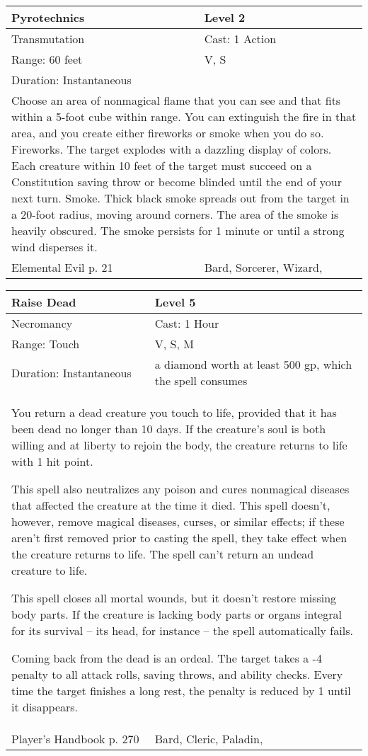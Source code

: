 \documentclass[11pt]{report}
\begin{document}
\begin{table}[H]
	\begin{tabular}{||p{6cm}|p{6cm}||}
		\hline\hline
		\bf{Pyrotechnics} & Level 2\\ \hline
		Transmutation & Cast: 1 Action\\ \hline
		Range: 60 feet & V, S\\ \hline
		Duration: Instantaneous & \\ \hline
		\multicolumn{2}{||p{12cm}||}{Choose an area of nonmagical flame that you can see and that fits within a 5-foot cube within range. You can extinguish the fire in that area, and you create either fireworks or smoke when you do so.
Fireworks. The target explodes with a dazzling display of colors. Each creature within 10 feet of the target must succeed on a Constitution saving throw or become blinded until the end of your next turn.
Smoke. Thick black smoke spreads out from the target in a 20-foot radius, moving around corners. The area of the smoke is heavily obscured. The smoke persists for 1 minute or until a strong wind disperses it.}\\ \hline
Elemental Evil p. 21 & Bard, Sorcerer, Wizard, \\ \hline\hline
	\end{tabular}
\end{table}

\begin{table}[H]
	\begin{tabular}{||p{6cm}|p{6cm}||}
		\hline\hline
		\bf{Raise Dead} & Level 5\\ \hline
		Necromancy & Cast: 1 Hour\\ \hline
		Range: Touch & V, S, M\\ \hline
		Duration: Instantaneous & a diamond worth at least 500 gp, which the spell consumes\\ \hline
		\multicolumn{2}{||p{12cm}||}{You return a dead creature you touch to life, provided that it has been dead no longer than 10 days. If the creature’s soul is both willing and at liberty to rejoin the body, the creature returns to life with 1 hit point.

This spell also neutralizes any poison and cures nonmagical diseases that affected the creature at the time it died. This spell doesn’t, however, remove magical diseases, curses, or similar effects; if these aren’t first removed prior to casting the spell, they take effect when the creature returns to life. The spell can’t return an undead creature to life.

This spell closes all mortal wounds, but it doesn’t restore missing body parts. If the creature is lacking body parts or organs integral for its survival – its head, for instance – the spell automatically fails.

Coming back from the dead is an ordeal. The target takes a -4 penalty to all attack rolls, saving throws, and ability checks. Every time the target finishes a long rest, the penalty is reduced by 1 until it disappears.}\\ \hline
Player's Handbook p. 270 & Bard, Cleric, Paladin, \\ \hline\hline
	\end{tabular}
\end{table}
\end{document}
